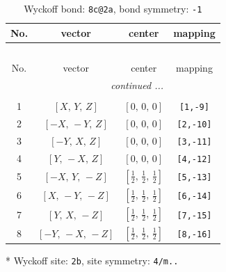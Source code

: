 \documentclass[fleqn,8pt]{jsarticle}
\begin{document}
\renewcommand{\arraystretch}{1.2}
\begin{longtable}{cccc}
\caption{Wyckoff bond: {\tt 8c@2a}, bond symmetry: {\tt -1}}
 \\
 \hline \hline
No. & vector & center & mapping \\ \hline \endfirsthead

\multicolumn{3}{l}{\tablename\ \thetable{}} \\
 \hline \hline
No. & vector & center & mapping \\ \hline \endhead

 \hline \hline
\multicolumn{3}{r}{\footnotesize\it continued ...} \\ \endfoot

 \hline \hline
\multicolumn{3}{r}{} \\ \endlastfoot

1 & $\left[ X,\, Y,\, Z \right]$ & $\left[ 0,\, 0,\, 0 \right]$ & {\tt [1,-9]} \\ \hline
2 & $\left[ - X,\, - Y,\, Z \right]$ & $\left[ 0,\, 0,\, 0 \right]$ & {\tt [2,-10]} \\ \hline
3 & $\left[ - Y,\, X,\, Z \right]$ & $\left[ 0,\, 0,\, 0 \right]$ & {\tt [3,-11]} \\ \hline
4 & $\left[ Y,\, - X,\, Z \right]$ & $\left[ 0,\, 0,\, 0 \right]$ & {\tt [4,-12]} \\ \hline
5 & $\left[ - X,\, Y,\, - Z \right]$ & $\left[ \frac{1}{2},\, \frac{1}{2},\, \frac{1}{2} \right]$ & {\tt [5,-13]} \\ \hline
6 & $\left[ X,\, - Y,\, - Z \right]$ & $\left[ \frac{1}{2},\, \frac{1}{2},\, \frac{1}{2} \right]$ & {\tt [6,-14]} \\ \hline
7 & $\left[ Y,\, X,\, - Z \right]$ & $\left[ \frac{1}{2},\, \frac{1}{2},\, \frac{1}{2} \right]$ & {\tt [7,-15]} \\ \hline
8 & $\left[ - Y,\, - X,\, - Z \right]$ & $\left[ \frac{1}{2},\, \frac{1}{2},\, \frac{1}{2} \right]$ & {\tt [8,-16]} \\
\end{longtable}
* Wyckoff site: {\tt 2b}, site symmetry: {\tt 4/m..}
\renewcommand{\arraystretch}{1.2}
\end{document}
